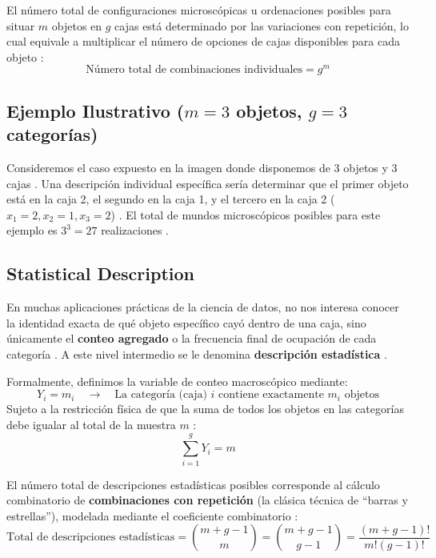 El número total de configuraciones microscópicas u ordenaciones posibles para situar $m$ objetos en $g$ cajas está determinado por las variaciones con repetición, lo cual equivale a multiplicar el número de opciones de cajas disponibles para cada objeto :
\begin{equation}
    \text{Número total de combinaciones individuales} = g^m 
\end{equation}

\subsection*{Ejemplo Ilustrativo ($m=3$ objetos, $g=3$ categorías)}
Consideremos el caso expuesto en la imagen donde disponemos de 3 objetos y 3 cajas . Una descripción individual específica sería determinar que el primer objeto está en la caja 2, el segundo en la caja 1, y el tercero en la caja 2 ($x_1=2, x_2=1, x_3=2$) . El total de mundos microscópicos posibles para este ejemplo es $3^3 = 27$ realizaciones .


\subsection{Statistical Description}

En muchas aplicaciones prácticas de la ciencia de datos, no nos interesa conocer la identidad exacta de qué objeto específico cayó dentro de una caja, sino únicamente el \textbf{conteo agregado} o la frecuencia final de ocupación de cada categoría . A este nivel intermedio se le denomina \textbf{descripción estadística} .

Formalmente, definimos la variable de conteo macroscópico mediante:
\begin{equation}
    Y_i = m_i \quad \longrightarrow \quad \text{La categoría (caja) $i$ contiene exactamente $m_i$ objetos} 
\end{equation}
Sujeto a la restricción física de que la suma de todos los objetos en las categorías debe igualar al total de la muestra $m$ :
\begin{equation}
    \sum_{i=1}^{g} Y_i = m 
\end{equation}

El número total de descripciones estadísticas posibles corresponde al cálculo combinatorio de \textbf{combinaciones con repetición} (la clásica técnica de ``barras y estrellas''), modelada mediante el coeficiente combinatorio :
\begin{equation}
    \text{Total de descripciones estadísticas} = \binom{m+g-1}{m} = \binom{m+g-1}{g-1} = \frac{(m+g-1)!}{m!(g-1)!} 
\end{equation}

